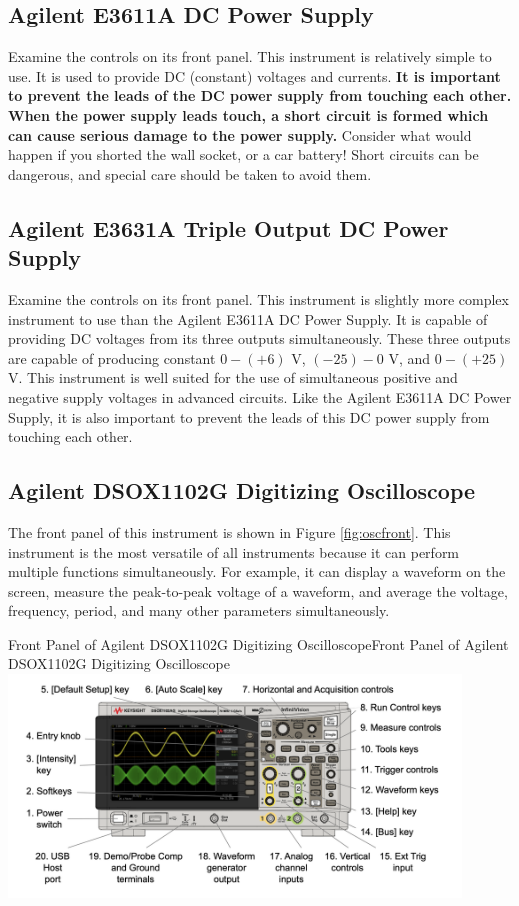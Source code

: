 \documentclass[12pt]{../manual}
\begin{document}
\subsection{Agilent E3611A DC Power Supply}
Examine the controls on its front panel. This instrument is relatively simple to use. It is used to provide DC (constant) voltages and currents. \textbf{It is important to prevent the leads of the DC power supply from touching each other. When the power supply leads touch, a short circuit is formed which can cause serious damage to the power supply.} Consider what would happen if you shorted the wall socket, or a car battery! Short circuits can be dangerous, and special care should be taken to avoid them.

\subsection{Agilent E3631A Triple Output DC Power Supply}
Examine the controls on its front panel. This instrument is slightly more complex instrument to use than the Agilent E3611A DC Power Supply. It is capable of providing DC voltages from its three outputs simultaneously. These three outputs are capable of producing constant $0 - (+6)$ V, $(-25) -0$ V, and $0 - (+25)$ V. This instrument is well suited for the use of simultaneous positive and negative supply voltages in advanced circuits. Like the Agilent E3611A DC Power Supply, it is also important to prevent the leads of this DC power supply from touching each other.

\subsection{Agilent DSOX1102G Digitizing Oscilloscope}
The front panel of this instrument is shown in Figure \ref{fig:oscfront}. This instrument is the most versatile of all instruments because it can perform multiple functions simultaneously. For example, it can display a waveform on the screen, measure the peak-to-peak voltage of a waveform, and average the voltage, frequency, period, and many other parameters simultaneously. 

\begin{myfigure}[colback=white, label=fig:oscfront]{Front Panel of Agilent DSOX1102G Digitizing Oscilloscope}{Front Panel of Agilent DSOX1102G Digitizing Oscilloscope}
\centering
\includegraphics[width=0.9\textwidth]{figures/OscFrontPanel.png}
\end{myfigure}
\end{document}
